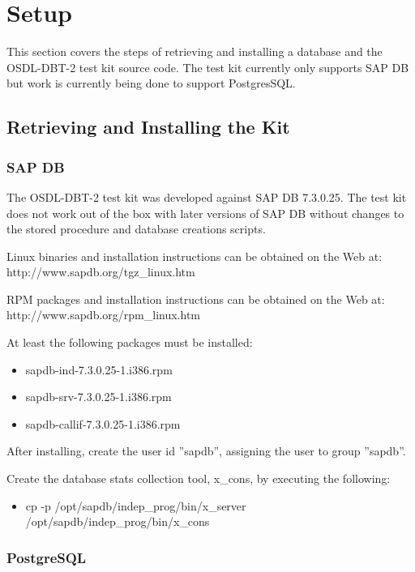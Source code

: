 \documentclass{article}
\begin{document}
\section{Setup}

This section covers the steps of retrieving and installing a database and the
OSDL-DBT-2 test kit source code.  The test kit currently only supports SAP DB
but work is currently being done to support PostgresSQL.

\subsection{Retrieving and Installing the Kit}

\subsubsection{SAP DB}

The OSDL-DBT-2 test kit was developed against SAP DB 7.3.0.25.  The test kit
does not work out of the box with later versions of SAP DB without changes
to the stored procedure and database creations scripts.

Linux binaries and installation instructions can be obtained on the Web at:
http://www.sapdb.org/tgz\_linux.htm

RPM packages and installation instructions can be obtained on the Web at:
http://www.sapdb.org/rpm\_linux.htm

At least the following packages must be installed:
\begin{itemize}
\item sapdb-ind-7.3.0.25-1.i386.rpm
\item sapdb-srv-7.3.0.25-1.i386.rpm
\item sapdb-callif-7.3.0.25-1.i386.rpm
\end{itemize}

After installing, create the user id ''sapdb'', assigning the user to group
''sapdb''.

Create the database stats collection tool, x\_cons, by executing the
following:
\begin{itemize}
\item cp -p /opt/sapdb/indep\_prog/bin/x\_server
      /opt/sapdb/indep\_prog/bin/x\_cons
\end{itemize}

\subsubsection{PostgreSQL}
\end{document}
